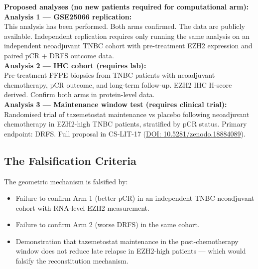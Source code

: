\documentclass[12pt, a4paper]{article}
\begin{document}
\begin{center}
\colorbox{actionbox}{
\begin{minipage}{0.88\textwidth}
\vspace{0.5em}
\textbf{Proposed analyses (no new patients required
for computational arm):}\\[0.4em]
\textbf{Analysis 1 --- GSE25066 replication:}\\
This analysis has been performed. Both arms
confirmed. The data are publicly available.
Independent replication requires only running
the same analysis on an independent neoadjuvant
TNBC cohort with pre-treatment EZH2 expression
and paired pCR + DRFS outcome data.\\[0.5em]
\textbf{Analysis 2 --- IHC cohort (requires lab):}\\
Pre-treatment FFPE biopsies from TNBC patients
with neoadjuvant chemotherapy, pCR outcome, and
long-term follow-up. EZH2 IHC H-score derived.
Confirm both arms in protein-level data.\\[0.5em]
\textbf{Analysis 3 --- Maintenance window test
(requires clinical trial):}\\
Randomised trial of tazemetostat maintenance
vs placebo following neoadjuvant chemotherapy
in EZH2-high TNBC patients, stratified by pCR
status. Primary endpoint: DRFS. Full proposal
in CS-LIT-17
(\href{https://doi.org/10.5281/zenodo.18884089}
{DOI: 10.5281/zenodo.18884089}).
\vspace{0.5em}
\end{minipage}}
\end{center}

\subsection{The Falsification Criteria}

The geometric mechanism is falsified by:

\begin{itemize}
    \item Failure to confirm Arm 1 (better pCR)
    in an independent TNBC neoadjuvant cohort
    with RNA-level EZH2 measurement.
    \item Failure to confirm Arm 2 (worse DRFS)
    in the same cohort.
    \item Demonstration that tazemetostat
    maintenance in the post-chemotherapy window
    does not reduce late relapse in EZH2-high
    patients --- which would falsify the
    reconstitution mechanism.
\end{itemize}
\end{document}
